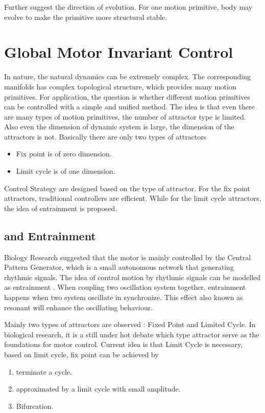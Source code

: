 Further \moit suggest the direction of evolution.
For one motion primitive, body may evolve to make the primitive more structural stable.






\section{Global Motor Invariant Control}
\label{sec:cpgcontrol}

In nature, the natural dynamics can be extremely complex. 
The corresponding manifolds has complex topological structure, which provides many motion primitives.
For \cms application, the question is whether different motion primitives can be controlled with a simple and unified method.
The idea is that even there are many types of motion primitives, the number of attractor type is limited. 
Also even the dimension of dynamic system is large, the dimension of the attractors is not. 
Basically there are only two types of attractors
\begin{itemize}
\item Fix point is of zero dimension. 
\item Limit cycle is of one dimension.
\end{itemize}

Control Strategy are designed based on the type of attractor.
For the fix point attractors, traditional \pd controllers are efficient.
While for the limit cycle attractors, the idea of entrainment is proposed.


\subsection{\cpg and Entrainment}
Biology Research suggested that the motor is mainly controlled by the Central Pattern Generator, which is a small autonomous network that generating rhythmic signals.
The idea of control motion by rhythmic signals can be modelled as entrainment \citep{Gonz'alez-Miranda2004}.
When coupling two oscillation system together, entrainment happens when two system oscillate in synchronize. 
This effect also known as resonant will enhance the oscillating behaviour. 




Mainly two types of attractors are observed : Fixed Point and Limited Cycle. 
In biological research, it is a still under hot debate which type attractor serve as the foundations for motor control\citep{Degallier2010}.
Current idea is that Limit Cycle is necessary, based on limit cycle, fix point can be achieved by
\begin{enumerate} 
\item terminate a cycle. 
\item approximated by a limit cycle with small amplitude.
\item Bifurcation. 
\end{enumerate}


